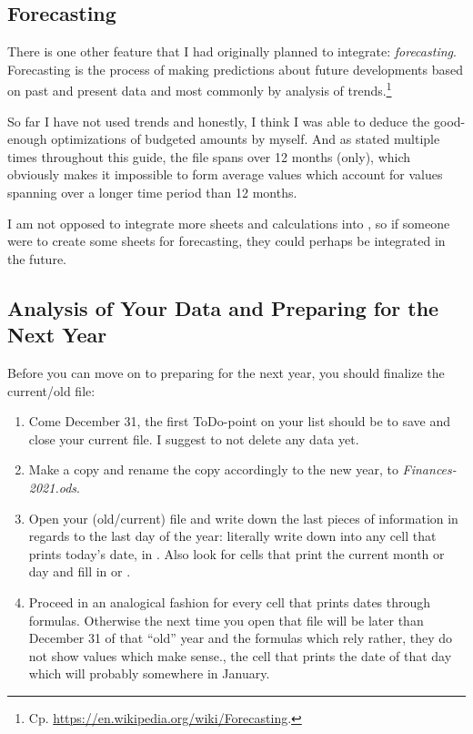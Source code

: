 \subsection{Forecasting}
\label{subsec:forecasting}

There is one other feature that I had originally planned to integrate: \emph{forecasting}.
Forecasting is the process of making predictions about future developments based on past and present data and most commonly by analysis of trends.\footnote{Cp. \href{https://en.wikipedia.org/wiki/Forecasting}{https://en.wikipedia.org/wiki/Forecasting}.}

So far I have not used trends and honestly, I think I was able to deduce the good-enough optimizations of budgeted amounts by myself.
And as stated multiple times throughout this guide, the file spans over 12 months (only), which obviously makes it impossible to form average values which account for values spanning over a longer time period than 12 months.

I am not opposed to integrate more sheets and calculations into \tfn, so if someone were to create some sheets for forecasting, they could perhaps be integrated in the future.

\subsection{Analysis of Your Data and Preparing for the Next Year}
\label{subsec:prepare-the-next-year-analysis}

Before you can move on to preparing \tfn for the next year, you should finalize the current/old file:
\begin{enumerate}
	\item Come December 31, the first ToDo-point on your list should be to save and close your current file.
	I suggest to not delete any data yet.
	\item Make a copy and rename the copy accordingly to the new year, \eg to \emph{Finances-2021.ods}.
	\item Open your (old/current) file and write down the last pieces of information in regards to the last day of the year: literally write down  into any cell that prints today's date, \eg in .
	Also look for cells that print the current month or day and fill in  or .
	\item Proceed in an analogical fashion for every cell that prints dates through formulas.
	Otherwise the next time you open that file will be later than December 31 of that ``old'' year and the formulas which rely rather, they do not show values which make sense., the cell that prints the date of that day which will probably somewhere in January.
\end{enumerate}

